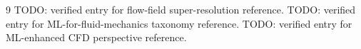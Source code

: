 \documentclass[11pt]{article}
\begin{document}
\begin{thebibliography}{9}
 TODO: verified entry for flow-field super-resolution reference.
 TODO: verified entry for ML-for-fluid-mechanics taxonomy reference.
 TODO: verified entry for ML-enhanced CFD perspective reference.
\end{thebibliography}
\end{document}
